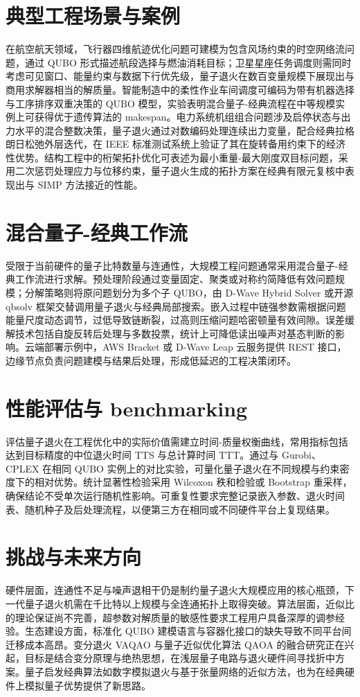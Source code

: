 \chapter{典型工程场景与案例}
在航空航天领域，飞行器四维航迹优化问题可建模为包含风场约束的时空网络流问题，通过 QUBO 形式描述航段选择与燃油消耗目标；卫星星座任务调度则需同时考虑可见窗口、能量约束与数据下行优先级，量子退火在数百变量规模下展现出与商用求解器相当的解质量。智能制造中的柔性作业车间调度可编码为带有机器选择与工序排序双重决策的 QUBO 模型，实验表明混合量子-经典流程在中等规模实例上可获得优于遗传算法的 makespan。电力系统机组组合问题涉及启停状态与出力水平的混合整数决策，量子退火通过对数编码处理连续出力变量，配合经典拉格朗日松弛外层迭代，在 IEEE 标准测试系统上验证了其在旋转备用约束下的经济性优势。结构工程中的桁架拓扑优化可表述为最小重量-最大刚度双目标问题，采用二次惩罚处理应力与位移约束，量子退火生成的拓扑方案在经典有限元复核中表现出与 SIMP 方法接近的性能。\par
\chapter{混合量子-经典工作流}
受限于当前硬件的量子比特数量与连通性，大规模工程问题通常采用混合量子-经典工作流进行求解。预处理阶段通过变量固定、聚类或对称约简降低有效问题规模；分解策略则将原问题划分为多个子 QUBO，由 D-Wave Hybrid Solver 或开源 qbsolv 框架交替调用量子退火与经典局部搜索。嵌入过程中链强参数需根据问题能量尺度动态调节，过低导致链断裂，过高则压缩问题哈密顿量有效间隙。误差缓解技术包括自旋反转后处理与多数投票，统计上可降低读出噪声对基态判断的影响。云端部署示例中，AWS Bracket 或 D-Wave Leap 云服务提供 REST 接口，边缘节点负责问题建模与结果后处理，形成低延迟的工程决策闭环。\par
\chapter{性能评估与 benchmarking}
评估量子退火在工程优化中的实际价值需建立时间-质量权衡曲线，常用指标包括达到目标精度的中位退火时间 TTS 与总计算时间 TTT。通过与 Gurobi、CPLEX 在相同 QUBO 实例上的对比实验，可量化量子退火在不同规模与约束密度下的相对优势。统计显著性检验采用 Wilcoxon 秩和检验或 Bootstrap 重采样，确保结论不受单次运行随机性影响。可重复性要求完整记录嵌入参数、退火时间表、随机种子及后处理流程，以便第三方在相同或不同硬件平台上复现结果。\par
\chapter{挑战与未来方向}
硬件层面，连通性不足与噪声退相干仍是制约量子退火大规模应用的核心瓶颈，下一代量子退火机需在千比特以上规模与全连通拓扑上取得突破。算法层面，近似比的理论保证尚不完善，超参数对解质量的敏感性要求工程用户具备深厚的调参经验。生态建设方面，标准化 QUBO 建模语言与容器化接口的缺失导致不同平台间迁移成本高昂。变分退火 VAQAO 与量子近似优化算法 QAOA 的融合研究正在兴起，目标是结合变分原理与绝热思想，在浅层量子电路与退火硬件间寻找折中方案。量子启发经典算法如数字模拟退火与基于张量网络的近似方法，也为在经典硬件上模拟量子优势提供了新思路。\par
